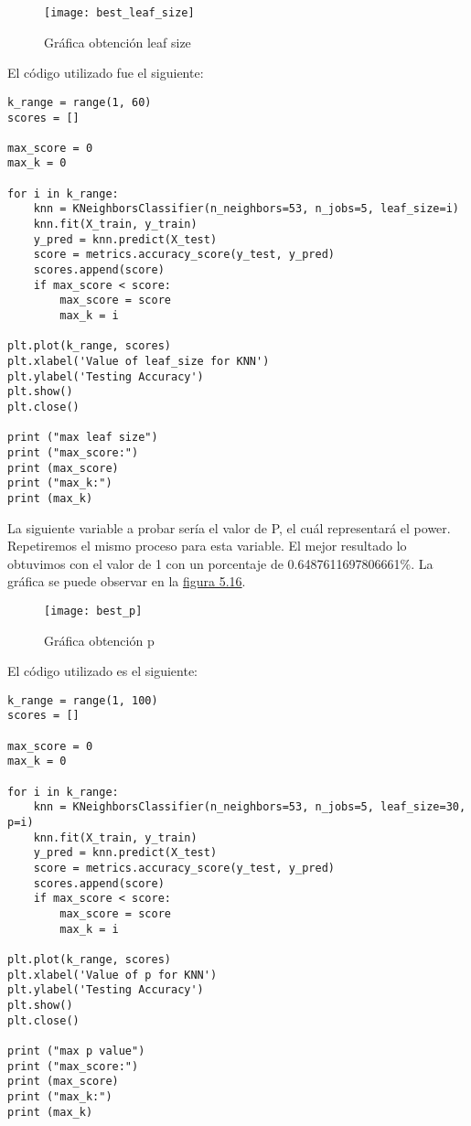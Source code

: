\begin{figure}[htb]
	\centering
	\texttt{[image: best\_leaf\_size]}
	\caption[Gráfica obtención leaf size]{Gráfica obtención leaf size}
	\label{fig:Gráfica obtención leaf size}
\end{figure}

El código utilizado fue el siguiente:

\begin{lstlisting}
k_range = range(1, 60)
scores = []

max_score = 0
max_k = 0

for i in k_range:
    knn = KNeighborsClassifier(n_neighbors=53, n_jobs=5, leaf_size=i)
    knn.fit(X_train, y_train)
    y_pred = knn.predict(X_test)
    score = metrics.accuracy_score(y_test, y_pred)
    scores.append(score)
    if max_score < score:
        max_score = score
        max_k = i

plt.plot(k_range, scores)
plt.xlabel('Value of leaf_size for KNN')
plt.ylabel('Testing Accuracy')
plt.show()
plt.close()

print ("max leaf size")
print ("max_score:")
print (max_score)
print ("max_k:")
print (max_k)
\end{lstlisting}



La siguiente variable a probar sería el valor de P, el cuál representará el power.
Repetiremos el mismo proceso para esta variable. El mejor resultado lo obtuvimos con
el valor de 1 con un porcentaje de 0.6487611697806661\%. La gráfica se puede observar
en la \hyperref[fig:Gráfica obtención p]{figura 5.16}.

\begin{figure}[htb]
	\centering
	\texttt{[image: best\_p]}
	\caption[Gráfica obtención p]{Gráfica obtención p}
	\label{fig:Gráfica obtención p}
\end{figure}


El código utilizado es el siguiente:
\begin{lstlisting}
k_range = range(1, 100)
scores = []

max_score = 0
max_k = 0

for i in k_range:
    knn = KNeighborsClassifier(n_neighbors=53, n_jobs=5, leaf_size=30, p=i)
    knn.fit(X_train, y_train)
    y_pred = knn.predict(X_test)
    score = metrics.accuracy_score(y_test, y_pred)
    scores.append(score)
    if max_score < score:
        max_score = score
        max_k = i

plt.plot(k_range, scores)
plt.xlabel('Value of p for KNN')
plt.ylabel('Testing Accuracy')
plt.show()
plt.close()

print ("max p value")
print ("max_score:")
print (max_score)
print ("max_k:")
print (max_k)
\end{lstlisting}


